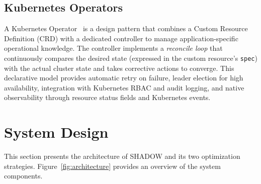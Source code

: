 \documentclass[conference]{IEEEtran}
\begin{document}
\subsection{Kubernetes Operators}
\label{sec:operators}

A Kubernetes Operator~\cite{operatorpattern} is a design pattern that combines
a Custom Resource Definition (CRD) with a dedicated controller to manage
application-specific operational knowledge. The controller implements a
\textit{reconcile loop} that continuously compares the desired state (expressed
in the custom resource's \texttt{spec}) with the actual cluster state and takes
corrective actions to converge. This declarative model provides automatic retry
on failure, leader election for high availability, integration with Kubernetes
RBAC and audit logging, and native observability through resource status fields
and Kubernetes events.


\section{System Design}
\label{sec:design}

This section presents the architecture of SHADOW and its two optimization
strategies. Figure~\ref{fig:architecture} provides an overview of the system
components.
\end{document}
